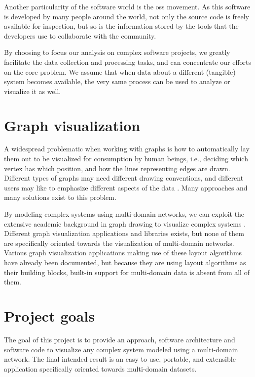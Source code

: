 Another particularity of the software world is the \gls{oss} movement. As this software is developed by many people around the world, not only the source code is freely available for inspection, but so is the information stored by the tools that the developers use to collaborate with the community.

By choosing to focus our analysis on complex software projects, we greatly facilitate the data collection and processing tasks, and can concentrate our efforts on the core problem. We assume that when data about a different (tangible) system becomes available, the very same process can be used to analyze or visualize it as well.

\section{Graph visualization}
\label{sec:intro/visu}

A widespread problematic when working with graphs is how to automatically lay them out to be visualized for consumption by human beings, i.e., deciding which vertex has which position, and how the lines representing edges are drawn. Different types of graphs may need different drawing conventions, and different users may like to emphasize different aspects of the data \cite{graphdraw,graphvisu}. Many approaches and many solutions exist to this problem.

By modeling complex systems using multi-domain networks, we can exploit the extensive academic background in graph drawing to visualize complex systems \cite{alg1,alg2,alg3,alg4}. Different graph visualization applications and libraries exists, but none of them are specifically oriented towards the visualization of multi-domain networks. Various graph visualization applications making use of these layout algorithms have already been documented, but because they are using layout algorithms as their building blocks, built-in support for multi-domain data is absent from all of them.

\section{Project goals}
\label{sec:intro/goals}
The goal of this project is to provide an approach, software architecture and software code to visualize any complex system modeled using a multi-domain network. The final intended result is an easy to use, portable, and extensible application specifically oriented towards multi-domain datasets.

